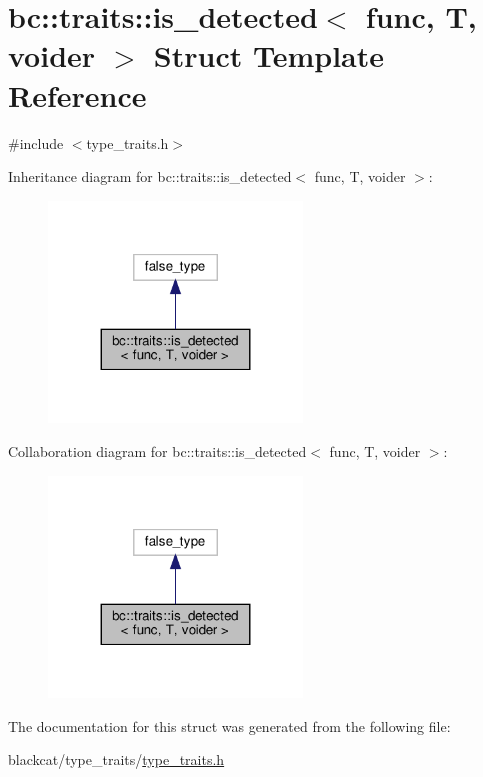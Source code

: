 \hypertarget{structbc_1_1traits_1_1is__detected}{}\section{bc\+:\+:traits\+:\+:is\+\_\+detected$<$ func, T, voider $>$ Struct Template Reference}
\label{structbc_1_1traits_1_1is__detected}


{\ttfamily \#include $<$type\+\_\+traits.\+h$>$}



Inheritance diagram for bc\+:\+:traits\+:\+:is\+\_\+detected$<$ func, T, voider $>$\+:\nopagebreak
\begin{figure}[H]
\begin{center}
\leavevmode
\includegraphics[width=191pt]{structbc_1_1traits_1_1is__detected__inherit__graph}
\end{center}
\end{figure}


Collaboration diagram for bc\+:\+:traits\+:\+:is\+\_\+detected$<$ func, T, voider $>$\+:\nopagebreak
\begin{figure}[H]
\begin{center}
\leavevmode
\includegraphics[width=191pt]{structbc_1_1traits_1_1is__detected__coll__graph}
\end{center}
\end{figure}


The documentation for this struct was generated from the following file\+:\begin{DoxyCompactItemize}
\item 
blackcat/type\+\_\+traits/\hyperlink{type__traits_2type__traits_8h}{type\+\_\+traits.\+h}\end{DoxyCompactItemize}
